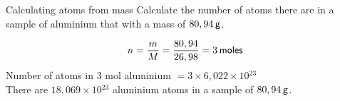     \noindent
\label{m38717*secfhsst!!!underscore!!!id494}\vspace{-2cm} 
      \noindent
      \begin{wex}{Calculating atoms from mass }{
\label{m38717*probfhsst!!!underscore!!!id495}
      \label{m38717*id277914}Calculate the number of atoms there are in a sample of aluminium that with a mass of $80,94\phantom{\rule{2pt}{0ex}}\mathsf{g}$.
      \vspace{5pt}}
{
      \label{m38717*id277959}\nopagebreak\noindent{}
        
    \begin{equation*}
    n=\frac{m}{M}=\frac{80,94}{26,98}=3\phantom{\rule{2pt}{0ex}}\mathsf{moles}
      \end{equation*}
      \label{m38717*id278019}Number of atoms in 3 mol aluminium $=3\ensuremath{\times}6,022\ensuremath{\times}10{}^{23}$ \\
      \label{m38717*id278053}There are $18,069\ensuremath{\times}10{}^{23}$ aluminium atoms in a sample of $80,94\phantom{\rule{2pt}{0ex}}\mathsf{g}$.
}
    \end{wex}
    \noindent
\label{m38717*secfhsst!!!underscore!!!id539}
